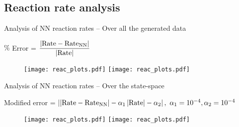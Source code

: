 \documentclass[xcolor=dvipsnames, 8pt]{beamer} %
\begin{document}
\subsection{Reaction rate analysis}
\begin{frame}{Analysis of NN reaction rates -- Over all the generated data}
	
	\centering
	$\%$ Error = $\dfrac{\left| \textnormal{Rate} - 
	\textnormal{Rate}_{\textnormal{NN}} \right|}{\left| \textnormal{Rate} \right|}$

	\begin{figure}
		\centering
		\texttt{[image: reac\_plots.pdf]}
		\texttt{[image: reac\_plots.pdf]}
	\end{figure}

\end{frame}

\begin{frame}{Analysis of NN reaction rates -- Over the state-space}
	
	\centering
	Modified error = $\norm{\norm{\textnormal{Rate} - 
						\textnormal{Rate}_{\textnormal{NN}}} - 
						\alpha_1\norm{\textnormal{Rate}} - \alpha_2}, \ 
						\alpha_1 = 10^{-4}, \alpha_2 = 10^{-4}$
	\begin{figure}
		\centering
		\texttt{[image: reac\_plots.pdf]}
		\texttt{[image: reac\_plots.pdf]}
	\end{figure}
	
\end{frame}
\end{document}
